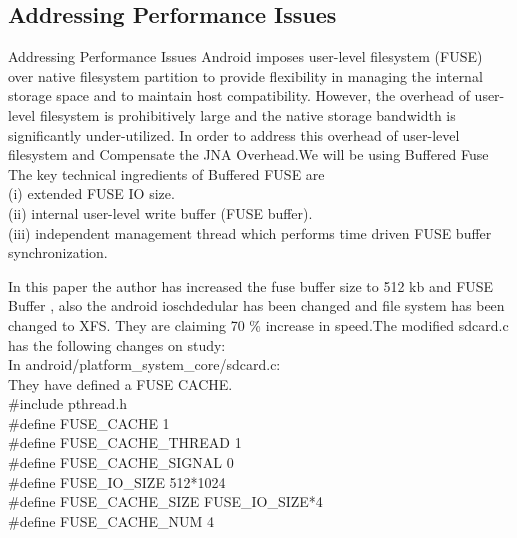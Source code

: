 \documentclass{beamer}
\begin{document}
\subsection{Addressing Performance Issues}
\begin{frame}{Addressing Performance Issues}
Android imposes user-level filesystem (FUSE) over native filesystem partition to provide flexibility in managing the internal storage space and to maintain host compatibility. However, the overhead of user-level filesystem is prohibitively large and the native storage bandwidth is significantly under-utilized.
In order to address this overhead of user-level filesystem and Compensate the JNA Overhead.We will be using Buffered Fuse\cite{jeong2014buffered}\\
\bigskip
The key technical ingredients of Buffered FUSE\cite{jeong2014buffered} are\\
(i) extended FUSE IO size.\\
(ii) internal user-level write buffer (FUSE buffer).\\
(iii) independent management thread which performs time driven FUSE buffer synchronization.
\end{frame}

\bigskip

\bigskip
In this paper\cite{jeong2014buffered} the author has increased the fuse buffer size to 512 kb and FUSE Buffer , also the android ioschdedular has been changed and file system has been changed to XFS. They are claiming 70 \% increase in speed.The modified sdcard.c has the following changes on study:\\
In android/platform\_system\_core/sdcard.c:\\
They have defined a FUSE CACHE.\\

\#include pthread.h\\
\#define FUSE\_CACHE 1\\ 
 \#define FUSE\_CACHE\_THREAD 1 \\
 \#define FUSE\_CACHE\_SIGNAL 0 \\
 \#define FUSE\_IO\_SIZE 512*1024\\
\#define FUSE\_CACHE\_SIZE FUSE\_IO\_SIZE*4\\
\#define FUSE\_CACHE\_NUM 4\\
\end{document}
